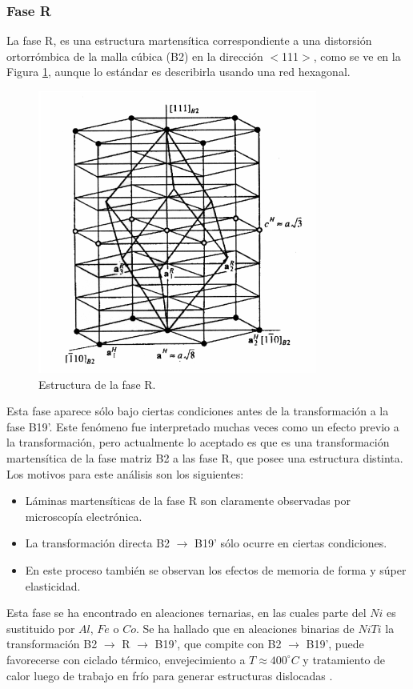 \documentclass[12pt]{article}
\theoremstyle{definition}
\theoremstyle{remark}
\begin{document}
\subsubsection{Fase R}
La fase R, es una estructura martensítica correspondiente a una distorsión
ortorrómbica de la malla cúbica (B2) en la dirección $<$111$>$, como se ve en la Figura \ref{RPhase}, aunque lo estándar es describirla usando una red hexagonal.
\begin{figure}[H]
	\centering	
	\includegraphics[scale=0.5]{img/RPhase.png}
	\caption{Estructura de la fase R.}
	\label{RPhase}
\end{figure}

Esta fase aparece sólo bajo ciertas condiciones antes de la transformación a la fase B19'. Este fenómeno fue interpretado muchas veces como un efecto previo a la transformación, pero actualmente lo aceptado es que es una transformación martensítica de la fase matriz B2 a las fase R, que posee una estructura distinta. Los motivos para este análisis son los siguientes:
\begin{itemize}
	\item Láminas martensíticas de la fase R son claramente observadas por microscopía electrónica.
	\item La transformación directa B2 $\rightarrow$ B19' sólo ocurre en ciertas condiciones.
	\item En este proceso también se observan los efectos de memoria de forma y súper elasticidad.
\end{itemize}


Esta fase se ha encontrado en aleaciones ternarias, en las cuales parte del $Ni$ es sustituido por $Al$, $Fe$ o $Co$. Se ha hallado que en  aleaciones binarias de $NiTi$ la transformación B2 $\rightarrow$ R $\rightarrow$ B19', que compite con B2 $\rightarrow$ B19', puede favorecerse con ciclado térmico, envejecimiento a $T \approx 400 ^\circ C$ y tratamiento de calor luego de trabajo en frío para generar estructuras dislocadas \citep{Santamarta}\citep{ThinFilm}\citep{TiNi}. 
\end{document}
